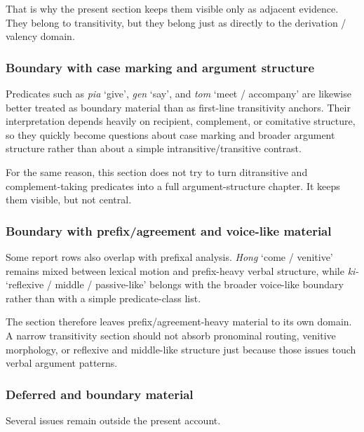 \documentclass[
  11pt,
  a4paper,
]{article}
\newcommand{\tdim}[1]{\textit{#1}}
\newcommand{\glossquote}[1]{`#1'}
\begin{document}
That is why the present section keeps them visible only as adjacent
evidence. They belong to transitivity, but they belong just as directly
to the derivation / valency domain.

\subsubsection{Boundary with case marking and argument
structure}\label{boundary-with-case-marking-and-argument-structure}

Predicates such as \tdim{pia} \glossquote{give}, \tdim{gen}
\glossquote{say}, and \tdim{tom} \glossquote{meet / accompany} are
likewise better treated as boundary material than as first-line
transitivity anchors. Their interpretation depends heavily on recipient,
complement, or comitative structure, so they quickly become questions
about case marking and broader argument structure rather than about a
simple intransitive/transitive contrast.

For the same reason, this section does not try to turn ditransitive and
complement-taking predicates into a full argument-structure chapter. It
keeps them visible, but not central.

\subsubsection{Boundary with prefix/agreement and voice-like
material}\label{boundary-with-prefixagreement-and-voice-like-material}

Some report rows also overlap with prefixal analysis. \tdim{Hong}
\glossquote{come / venitive} remains mixed between lexical motion and
prefix-heavy verbal structure, while \tdim{ki-}
\glossquote{reflexive / middle / passive-like} belongs with the broader
voice-like boundary rather than with a simple predicate-class list.

The section therefore leaves prefix/agreement-heavy material to its own
domain. A narrow transitivity section should not absorb pronominal
routing, venitive morphology, or reflexive and middle-like structure
just because those issues touch verbal argument patterns.

\subsubsection{Deferred and boundary
material}\label{deferred-and-boundary-material-3}

Several issues remain outside the present account.
\end{document}
